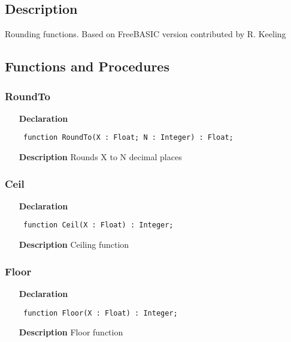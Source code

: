 \documentclass[12pt,a4paper,oneside]{report}
\newcommand{\declarationitem}[1]{\textbf{#1}}
\newcommand{\descriptiontitle}[1]{\textbf{#1}}
\newcommand{\code}[1]{\texttt{#1}}
\begin{document}
\subsection{Description}
Rounding functions. Based on FreeBASIC version contributed by R. Keeling 
\subsection{Functions and Procedures}
\subsubsection{RoundTo}
\label{uround-RoundTo}
\begin{itemize}\item[\declarationitem{Declaration}\hfill]
	\begin{flushleft}
		\code{
			function RoundTo(X : Float; N : Integer) : Float;}
		
	\end{flushleft}
	
	\par
	\item[\descriptiontitle{Description}]
	Rounds X to N decimal places
	
\end{itemize}
\subsubsection{Ceil}
\label{uround-Ceil}
\begin{itemize}\item[\declarationitem{Declaration}\hfill]
	\begin{flushleft}
		\code{
			function Ceil(X : Float) : Integer;}
		
	\end{flushleft}
	
	\par
	\item[\descriptiontitle{Description}]
	Ceiling function
	
\end{itemize}
\subsubsection{Floor}
\label{uround-Floor}
\begin{itemize}\item[\declarationitem{Declaration}\hfill]
	\begin{flushleft}
		\code{
			function Floor(X : Float) : Integer;}
		
	\end{flushleft}
	
	\par
	\item[\descriptiontitle{Description}]
	Floor function
	
\end{itemize}
\end{document}

